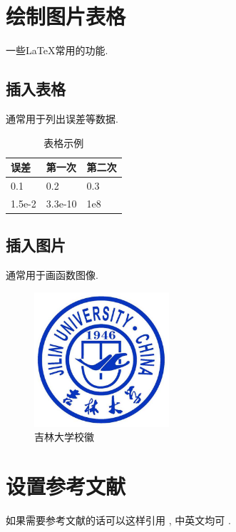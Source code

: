 \documentclass[UTF8]{ctexart}
\begin{document}
\section{绘制图片表格}
一些LaTeX常用的功能.

\subsection{插入表格}
通常用于列出误差等数据.

\begin{table}[h]
	\centering
	\begin{tabular}{|l|l|l|}
		\hline
		误差 &  第一次 & 第二次 \\
		\hline
		0.1  &  0.2   & 0.3   \\
		\hline
		1.5e-2 & 3.3e-10 & 1e8 \\
		\hline
	\end{tabular}
\caption{表格示例}
\end{table}

\subsection{插入图片}
通常用于画函数图像.

\begin{figure}[h]
	\centering
	\includegraphics[width=5cm]{Pics/jlu.jpg}
	\caption{吉林大学校徽}
\end{figure}

\section{设置参考文献}
如果需要参考文献的话可以这样引用 \cite{Yan2004}, 中英文均可 \cite{Ma2022}.

\begin{thebibliography}{99}
	
	
	
\end{thebibliography}
\end{document}
